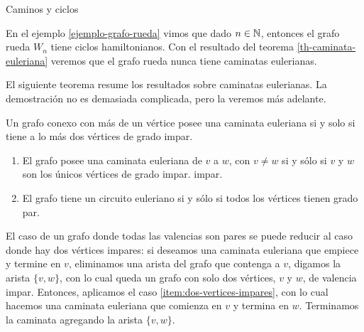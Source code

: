 \begin{section}{Caminos y ciclos}
\begin{ejemplo*}
    En  el ejemplo \ref{ejemplo-grafo-rueda} vimos que dado $n \in {\mathbb N}$, entonces el grafo rueda $W_n$ tiene ciclos hamiltonianos. Con el resultado del teorema \ref{th-caminata-euleriana} veremos que  el grafo rueda nunca tiene caminatas eulerianas. 
\end{ejemplo*}

El siguiente teorema resume los resultados sobre caminatas eulerianas. La demostración no es demasiada complicada, pero la veremos más adelante.  

\begin{teorema}\label{th-caminata-euleriana} Un grafo conexo con más de un vértice posee una caminata euleriana si y solo si tiene a lo más dos vértices de grado impar. 
\begin{enumerate}
    \item\label{item:dos-vertices-impares} El grafo posee una caminata  euleriana de $v$ a $w$, con $v \not= w$ si y sólo si $v$ y $w$ son los únicos vértices de grado impar.
    impar.
    \item\label{item:todos-los-vertices-pares} El grafo tiene un circuito euleriano si y sólo si todos los vértices tienen grado par.
\end{enumerate}
\end{teorema}

\begin{observacion}\label{obs-par-a-impar}
    El caso de un grafo donde todas las valencias son pares se puede reducir al caso donde hay dos vértices impares: si deseamos una caminata euleriana que empiece y termine en $v$, eliminamos una arista del grafo que contenga a $v$, digamos la arista $\{v,w\}$, con lo cual queda un grafo  con solo dos vértices, $v$ y $w$, de valencia impar. Entonces, aplicamos el caso  \ref{item:dos-vertices-impares}, con lo cual hacemos una caminata euleriana que comienza en $v$ y  termina en  $w$. Terminamos la caminata agregando  la arista $\{v,w\}$. 
\end{observacion}



\end{section}
